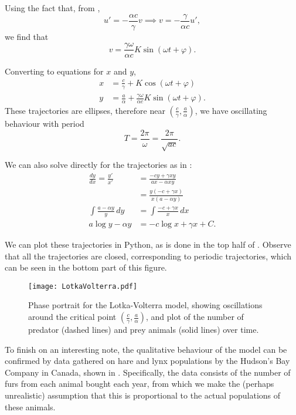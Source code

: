 Using the fact that, from ,
\[
u' = -\frac{\alpha c}{\gamma}v \implies v = -\frac{\gamma}{\alpha c}u',
\]
we find that
\[
v = \frac{\gamma \omega}{\alpha c}K\sin(\omega t + \varphi).
\]

Converting to equations for $x$ and $y$,
\begin{align*}
	x &= \frac{c}{\gamma} + K\cos(\omega t + \varphi) \\
	y &= \frac{a}{\alpha} + \frac{\gamma \omega}{\alpha c}K\sin(\omega t + \varphi).
\end{align*}
These trajectories are ellipses, therefore near $(\frac{c}{\gamma}, \frac{a}{\alpha})$, we have oscillating behaviour with period
\[
T = \frac{2\pi}{\omega} = \frac{2\pi}{\sqrt{ac}}.
\]

We can also solve directly for the trajectories as in :
\begin{align*}
	\frac{dy}{dx} = \frac{y'}{x'} &= \frac{-cy + \gamma xy}{ax - \alpha xy} \\
	&= \frac{y(-c+\gamma x)}{x(a-\alpha y)} \\
	\int \frac{a-\alpha y}{y} \,dy &= \int \frac{-c+\gamma x}{x}\,dx \\
	a\log y - \alpha y &= -c\log x + \gamma x + C.
\end{align*}

We can plot these trajectories in Python, as is done in the top half of . Observe that all the trajectories are closed, corresponding to periodic trajectories, which can be seen in the bottom part of this figure.

\begin{figure}[!ht]
	\centering
	\texttt{[image: LotkaVolterra.pdf]}
	\caption{Phase portrait for the Lotka-Volterra model, showing oscillations around the critical point $(\frac{c}{\gamma}, \frac{a}{\alpha})$, and plot of the number of predator (dashed lines) and prey animals (solid lines) over time.}
	\label{fig:lotkavolterra}
\end{figure}

To finish on an interesting note, the qualitative behaviour of the model can be confirmed by data gathered on hare and lynx populations by the Hudson's Bay Company in Canada, shown in . Specifically, the data consists of the number of furs from each animal bought each year, from which we make the (perhaps unrealistic) assumption that this is proportional to the actual populations of these animals.

